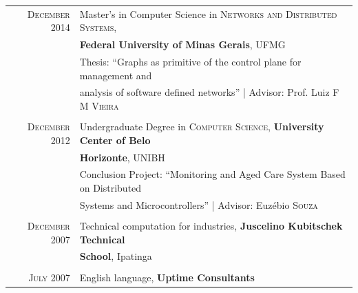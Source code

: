 \documentclass[a4paper,10pt]{article} %
\begin{document}
\begin{tabular}{rl}
\textsc{December} 2014 & Master's in Computer Science in
\textsc{Networks and Distributed Systems}, \\
& \textbf{Federal University of Minas Gerais}, UFMG \\
& Thesis: ``Graphs as primitive of the control plane for management and
\\ & analysis of software defined networks''
| \small Advisor: Prof. Luiz \textsc{F M Vieira} \\
&\\


\textsc{December} 2012& Undergraduate Degree in
\textsc{}\textsc{Computer Science},
\normalsize\textbf{ University Center of Belo}
\\ & \textbf{Horizonte}, UNIBH \\
& Conclusion Project: ``Monitoring and Aged Care System Based on
Distributed
\\ & Systems and Microcontrollers''
| \small Advisor: Euzébio \textsc{Souza} \\
&\\


\textsc{December} 2007 &Technical computation for industries,
\textbf{Juscelino Kubitschek Technical}
\\ & \textbf{School}, Ipatinga \\
&\\


\textsc{July} 2007 & English language, \textbf{Uptime Consultants}
\end{tabular}
\end{document}
